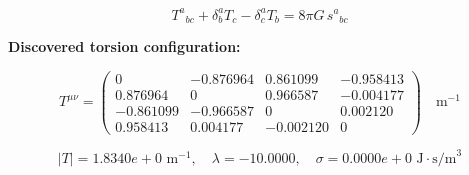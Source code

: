 
\begin{equation}
  T^a{}_{bc} + \delta^a_b T_c - \delta^a_c T_b = 8\pi G \, s^a{}_{bc}
\end{equation}

\textbf{Discovered torsion configuration:}

\begin{equation}
  T^{\mu\nu} = \begin{pmatrix}
    0 & -0.876964 & 0.861099 & -0.958413 \\
    0.876964 & 0 & 0.966587 & -0.004177 \\
    -0.861099 & -0.966587 & 0 & 0.002120 \\
    0.958413 & 0.004177 & -0.002120 & 0
  \end{pmatrix} \quad \text{m}^{-1}
\end{equation}

\begin{equation}
  |T| = 1.8340e+0 \text{ m}^{-1}, \quad
  \lambda = -10.0000, \quad
  \sigma = 0.0000e+0 \text{ J}\cdot\text{s/m}^3
\end{equation}
